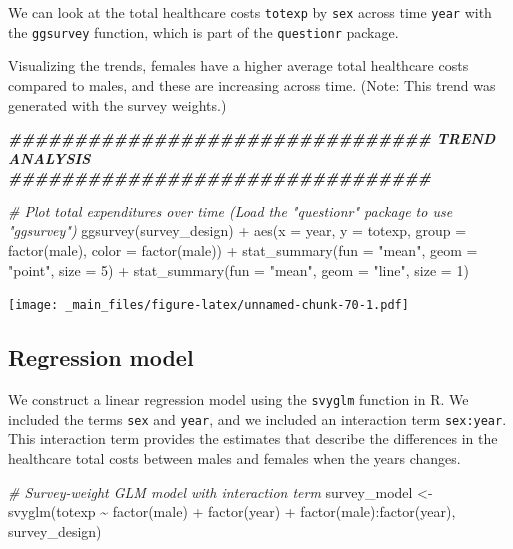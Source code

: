 \documentclass[
]{book}
\newenvironment{Shaded}{\begin{snugshade}}{\end{snugshade}}
\newcommand{\AttributeTok}[1]{\textcolor[rgb]{0.77,0.63,0.00}{#1}}
\newcommand{\CommentTok}[1]{\textcolor[rgb]{0.56,0.35,0.01}{\textit{#1}}}
\newcommand{\DecValTok}[1]{\textcolor[rgb]{0.00,0.00,0.81}{#1}}
\newcommand{\DocumentationTok}[1]{\textcolor[rgb]{0.56,0.35,0.01}{\textbf{\textit{#1}}}}
\newcommand{\FunctionTok}[1]{\textcolor[rgb]{0.00,0.00,0.00}{#1}}
\newcommand{\NormalTok}[1]{#1}
\newcommand{\OtherTok}[1]{\textcolor[rgb]{0.56,0.35,0.01}{#1}}
\newcommand{\SpecialCharTok}[1]{\textcolor[rgb]{0.00,0.00,0.00}{#1}}
\newcommand{\StringTok}[1]{\textcolor[rgb]{0.31,0.60,0.02}{#1}}
\begin{document}
We can look at the total healthcare costs \texttt{totexp} by \texttt{sex} across time \texttt{year} with the \texttt{ggsurvey} function, which is part of the \texttt{questionr} package.

Visualizing the trends, females have a higher average total healthcare costs compared to males, and these are increasing across time. (Note: This trend was generated with the survey weights.)

\begin{Shaded}
\begin{Highlighting}[]
\DocumentationTok{\#\#\#\#\#\#\#\#\#\#\#\#\#\#\#\#\#\#\#\#\#\#\#\#\#\#\#\#\#\#\#\# TREND ANALYSIS \#\#\#\#\#\#\#\#\#\#\#\#\#\#\#\#\#\#\#\#\#\#\#\#\#\#\#\#\#\#\#\# }

\CommentTok{\# Plot total expenditures over time (Load the "questionr" package to use "ggsurvey")}
\FunctionTok{ggsurvey}\NormalTok{(survey\_design) }\SpecialCharTok{+}
  \FunctionTok{aes}\NormalTok{(}\AttributeTok{x =}\NormalTok{ year, }\AttributeTok{y =}\NormalTok{ totexp, }\AttributeTok{group =} \FunctionTok{factor}\NormalTok{(male), }\AttributeTok{color =} \FunctionTok{factor}\NormalTok{(male)) }\SpecialCharTok{+}
  \FunctionTok{stat\_summary}\NormalTok{(}\AttributeTok{fun =} \StringTok{"mean"}\NormalTok{, }\AttributeTok{geom =} \StringTok{"point"}\NormalTok{, }\AttributeTok{size =} \DecValTok{5}\NormalTok{) }\SpecialCharTok{+} 
  \FunctionTok{stat\_summary}\NormalTok{(}\AttributeTok{fun =} \StringTok{"mean"}\NormalTok{, }\AttributeTok{geom =} \StringTok{"line"}\NormalTok{, }\AttributeTok{size =} \DecValTok{1}\NormalTok{) }
\end{Highlighting}
\end{Shaded}

\texttt{[image: \_main\_files/figure-latex/unnamed-chunk-70-1.pdf]}

\hypertarget{regression-model}{%
\subsection{Regression model}\label{regression-model}}

We construct a linear regression model using the \texttt{svyglm} function in R. We included the terms \texttt{sex} and \texttt{year}, and we included an interaction term \texttt{sex:year}. This interaction term provides the estimates that describe the differences in the healthcare total costs between males and females when the years changes.

\begin{Shaded}
\begin{Highlighting}[]
\CommentTok{\# Survey{-}weight GLM model with interaction term}
\NormalTok{survey\_model }\OtherTok{\textless{}{-}} \FunctionTok{svyglm}\NormalTok{(totexp }\SpecialCharTok{\textasciitilde{}} \FunctionTok{factor}\NormalTok{(male) }\SpecialCharTok{+} \FunctionTok{factor}\NormalTok{(year) }\SpecialCharTok{+} \FunctionTok{factor}\NormalTok{(male)}\SpecialCharTok{:}\FunctionTok{factor}\NormalTok{(year), survey\_design)}
\end{Highlighting}
\end{Shaded}
\end{document}

